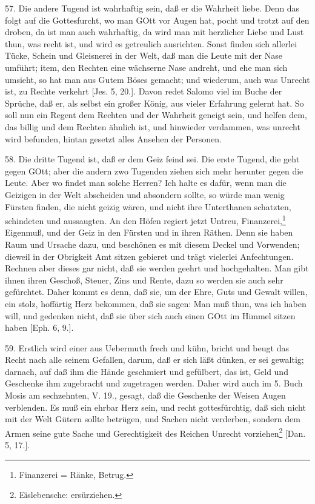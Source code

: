 57. Die andere Tugend ist wahrhaftig sein, daß er die Wahrheit liebe. Denn das folgt auf die Gottesfurcht, wo man GOtt vor Augen hat, pocht und trotzt auf den droben, da ist man auch wahrhaftig, da wird man mit herzlicher Liebe und Lust thun, was recht ist, und wird es getreulich ausrichten. Sonst finden sich allerlei Tücke, Schein und Gleisnerei in der Welt, daß man die Leute mit der Nase umführt; item, den Rechten eine wächserne Nase andreht, und ehe man sich umsieht, so hat man aus Gutem Böses gemacht; und wiederum, auch was Unrecht ist, zu Rechte verkehrt [Jes. 5, 20.]. Davon redet Salomo viel im Buche der Sprüche, daß er, als selbst ein großer König, aus vieler Erfahrung gelernt hat. So soll nun ein Regent dem Rechten und der Wahrheit geneigt sein, und helfen dem, das billig und dem Rechten ähnlich ist, und hinwieder verdammen, was unrecht wird befunden, hintan gesetzt alles Ansehen der Personen.

58. Die dritte Tugend ist, daß er dem Geiz feind sei. Die erste Tugend, die geht gegen GOtt; aber die andern zwo Tugenden ziehen sich mehr herunter gegen die Leute. Aber wo findet man solche Herren? Ich halte es dafür, wenn man die Geizigen in der Welt abscheiden und absondern sollte, so würde man wenig Fürsten finden, die nicht geizig wären, und nicht ihre Unterthanen schatzten, schindeten und aussaugten. An den Höfen regiert jetzt Untreu, Finanzerei,\footnote{Finanzerei = Ränke, Betrug.} Eigenmuß, und der Geiz in den
Fürsten und in ihren Räthen. Denn sie haben Raum und Ursache dazu, und beschönen es mit diesem Deckel und Vorwenden; dieweil in der Obrigkeit Amt sitzen gebieret und trägt vielerlei Anfechtungen. Rechnen aber dieses gar nicht, daß sie werden geehrt und hochgehalten. Man gibt ihnen ihren Geschoß, Steuer, Zins und Rente, dazu so werden sie auch sehr gefürchtet. Daher kommt es denn, daß sie, um der Ehre, Guts und Gewalt willen, ein stolz, hoffärtig Herz bekommen, daß sie sagen: Man muß thun, was ich haben will, und gedenken nicht, daß sie über sich auch einen GOtt im Himmel sitzen haben [Eph. 6, 9.].

59. Erstlich wird einer aus Uebermuth frech und kühn, bricht und beugt das Recht nach alle seinem Gefallen, darum, daß er sich läßt dünken, er sei gewaltig; darnach, auf daß ihm die Hände geschmiert und gefülbert, das ist, Geld und Geschenke ihm zugebracht und zugetragen werden. Daher wird auch im 5. Buch Mosis am sechzehnten, V. 19., gesagt, daß die Geschenke der Weisen Augen verblenden. Es muß ein ehrbar Herz sein, und recht gottesfürchtig, daß sich nicht mit der Welt Gütern sollte betrügen, und Sachen nicht verderben, sondern dem Armen seine gute Sache und Gerechtigkeit des Reichen Unrecht vorziehen\footnote{Eislebensche: ersürziehen.} [Dan. 5, 17.].

